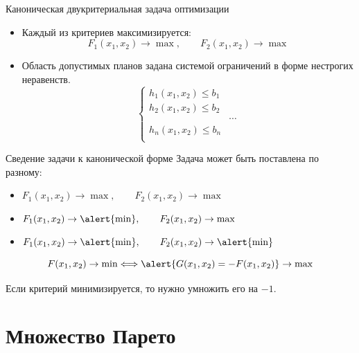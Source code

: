 \documentclass[unicode,11pt,notheorems,xcolor=table]{beamer}
\begin{document}
\begin{frame}{Каноническая двукритериальная задача оптимизации}{}
    \begin{itemize}
        \item Каждый из критериев максимизируется:
        $$
            F_1(x_1,x_2) \to \max, \qquad F_2(x_1,x_2) \to \max
        $$
        \item Область допустимых планов задана системой ограничений в форме нестрогих неравенств.
        $$  \left\lbrace
            \begin{aligned}
                h_1(x_1,x_2) \leqslant b_1\\
                h_2(x_1,x_2) \leqslant b_2\\
                &\cdots \\
                h_n(x_1,x_2) \leqslant b_n\\
            \end{aligned}
            \right.
        $$
        \end{itemize}
\end{frame}

\begin{frame}{Сведение задачи к канонической форме}{}
    Задача может быть поставлена по разному:

    \begin{itemize}
        \item $ F_1(x_1,x_2) \to \max, \qquad F_2(x_1,x_2) \to \max $
        \item $ F_1(x_1,x_2) \to \alert{\min}, \qquad F_2(x_1,x_2) \to \max $
        \item $ F_1(x_1,x_2) \to \alert{\min}, \qquad F_2(x_1,x_2) \to \alert{\min} $
    \end{itemize}
    \pause
    \begin{block}{}
        $$
        F(x_1,x_2) \to \min \Longleftrightarrow \alert{G(x_1,x_2)= -F(x_1,x_2)} \to \max
        $$
    \end{block}

    \bigskip
    Если критерий минимизируется, то нужно умножить его на $-1$.
\end{frame}

\section{Множество Парето}
\end{document}
